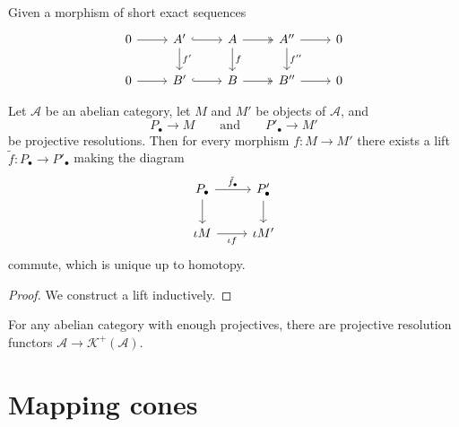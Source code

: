 \documentclass[main.tex]{subfiles}
\begin{document}
\begin{theorem}
  \label{thm:horseshoe_lemma_for_morphisms}
  Given a morphism of short exact sequences
  \begin{equation*}
    \begin{tikzcd}
      0
      \arrow[r]
      & A'
      \arrow[r, hook]
      \arrow[d, "f'"]
      & A
      \arrow[r, two heads]
      \arrow[d, "f"]
      & A''
      \arrow[r]
      \arrow[d, "f''"]
      & 0
      \\
      0
      \arrow[r]
      & B'
      \arrow[r, hook]
      & B
      \arrow[r, two heads]
      & B''
      \arrow[r]
      & 0
    \end{tikzcd}
  \end{equation*}
\end{theorem}

\begin{proposition}
  \label{prop:can_lift_morphisms_to_projective_resolutions}
  Let $\mathcal{A}$ be an abelian category, let $M$ and $M'$ be objects of $\mathcal{A}$, and
  \begin{equation*}
    P_{\bullet} \to M \qquad\text{and}\qquad P'_{\bullet} \to M'
  \end{equation*}
  be projective resolutions. Then for every morphism $f\colon M \to M'$ there exists a lift $\tilde{f}\colon P_{\bullet} \to P'_{\bullet}$ making the diagram
  \begin{equation*}
    \begin{tikzcd}
      P_{\bullet}
      \arrow[r, "\tilde{f}_{\bullet}"]
      \arrow[d]
      & P'_{\bullet}
      \arrow[d]
      \\
      \iota M
      \arrow[r, swap, "\iota f"]
      & \iota M'
    \end{tikzcd}
  \end{equation*}
  commute, which is unique up to homotopy.
\end{proposition}
\begin{proof}
  We construct a lift inductively.
\end{proof}

\begin{corollary}
  \label{cor:projective_resolution_functor}
  For any abelian category with enough projectives, there are projective resolution functors $\mathcal{A} \to \mathcal{K}^{+}(\mathcal{A})$.
\end{corollary}

\section{Mapping cones}
\label{sec:mapping_cones}
\end{document}
